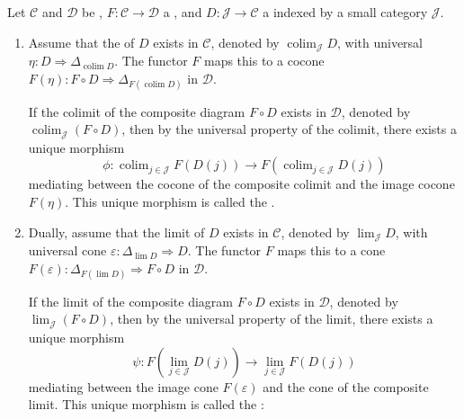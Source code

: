 \begin{definition} \label{definition:comparison_morphism_of_limits_and_colimits_under_functors}
    Let $\mathcal{C}$ and $\mathcal{D}$ be , $F: \mathcal{C} \to \mathcal{D}$ a , and $D: \mathcal{J} \to \mathcal{C}$ a  indexed by a small category $\mathcal{J}$.

    \begin{enumerate}
        \item Assume that the  of $D$ exists in $\mathcal{C}$, denoted by $\operatorname{colim}_{\mathcal{J}} D$, with universal  $\eta: D \Rightarrow \Delta_{\operatorname{colim} D}$. The functor $F$ maps this to a cocone $F(\eta): F \circ D \Rightarrow \Delta_{F(\operatorname{colim} D)}$ in $\mathcal{D}$.
        
        If the colimit of the composite diagram $F \circ D$ exists in $\mathcal{D}$, denoted by $\operatorname{colim}_{\mathcal{J}} (F \circ D)$, then by the universal property of the colimit, there exists a unique morphism 
        $$\phi: \operatorname{colim}_{j \in \mathcal{J}} F(D(j)) \longrightarrow F\left(\operatorname{colim}_{j \in \mathcal{J}} D(j)\right)$$
        mediating between the cocone of the composite colimit and the image cocone $F(\eta)$. This unique morphism is called the .
        
        \item Dually, assume that the limit of $D$ exists in $\mathcal{C}$, denoted by $\lim_{\mathcal{J}} D$, with universal cone $\varepsilon: \Delta_{\lim D} \Rightarrow D$. The functor $F$ maps this to a cone $F(\varepsilon): \Delta_{F(\lim D)} \Rightarrow F \circ D$ in $\mathcal{D}$.
        
        If the limit of the composite diagram $F \circ D$ exists in $\mathcal{D}$, denoted by $\lim_{\mathcal{J}} (F \circ D)$, then by the universal property of the limit, there exists a unique morphism 
        $$\psi: F\left(\lim_{j \in \mathcal{J}} D(j)\right) \longrightarrow \lim_{j \in \mathcal{J}} F(D(j))$$
        mediating between the image cone $F(\varepsilon)$ and the cone of the composite limit. This unique morphism is called the :
    \end{enumerate}
\end{definition}